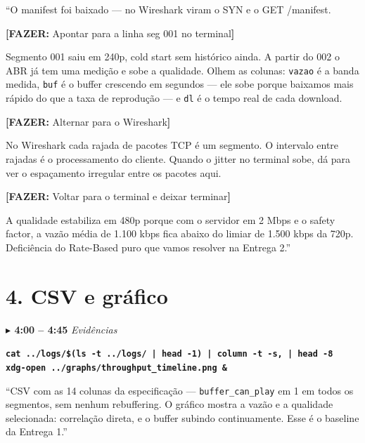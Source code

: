 \documentclass[12pt,a4paper]{article}
\newcommand{\cmd}[1]{\texttt{\textbf{#1}}}
\newcommand{\acaoinline}[1]{%
  \par\vspace{3pt}%
  \noindent\colorbox{cacao!18}{%
    \parbox{\dimexpr\linewidth-2\fboxsep}{%
      \small\textcolor{cacao}{\textbf{[FAZER:}} #1\textcolor{cacao}{\textbf{]}}}}%
  \par\vspace{3pt}}
\newcommand{\tempo}[2]{%
  \vspace{5pt}
  \begin{tcolorbox}[base,colback=ctempo!8,colframe=ctempo,boxrule=1pt,
    left=6pt,right=6pt,top=2pt,bottom=2pt]
  \textcolor{ctempo}{\textbf{$\blacktriangleright$ #1}}%
  \hfill\textcolor{ctempo}{\small\textit{#2}}
  \end{tcolorbox}\vspace{3pt}}
\begin{document}
\begin{falabox}
``O manifest foi baixado — no Wireshark viram o SYN e o GET /manifest.

\acaoinline{Apontar para a linha seg 001 no terminal}

Segmento 001 saiu em 240p, cold start sem histórico ainda. A partir do 002 o
ABR já tem uma medição e sobe a qualidade. Olhem as colunas: \texttt{vazao}
é a banda medida, \texttt{buf} é o buffer crescendo em segundos — ele sobe
porque baixamos mais rápido do que a taxa de reprodução — e \texttt{dl} é o
tempo real de cada download.

\acaoinline{Alternar para o Wireshark}

No Wireshark cada rajada de pacotes TCP é um segmento. O intervalo entre
rajadas é o processamento do cliente. Quando o jitter no terminal sobe, dá
para ver o espaçamento irregular entre os pacotes aqui.

\acaoinline{Voltar para o terminal e deixar terminar}

A qualidade estabiliza em 480p porque com o servidor em 2 Mbps e o safety
factor, a vazão média de 1.100 kbps fica abaixo do limiar de 1.500 kbps da
720p. Deficiência do Rate-Based puro que vamos resolver na Entrega 2.''
\end{falabox}

\section{4. CSV e gráfico}

\tempo{4:00 – 4:45}{Evidências}

\begin{acaobox}
\cmd{cat ../logs/\$(ls -t ../logs/ | head -1) | column -t -s, | head -8}\\[4pt]
\cmd{xdg-open ../graphs/throughput\_timeline.png \&}
\end{acaobox}

\vspace{3pt}

\begin{falabox}
``CSV com as 14 colunas da especificação — \texttt{buffer\_can\_play} em 1 em
todos os segmentos, sem nenhum rebuffering. O gráfico mostra a vazão e a
qualidade selecionada: correlação direta, e o buffer subindo continuamente.
Esse é o baseline da Entrega 1.''
\end{falabox}
\end{document}
